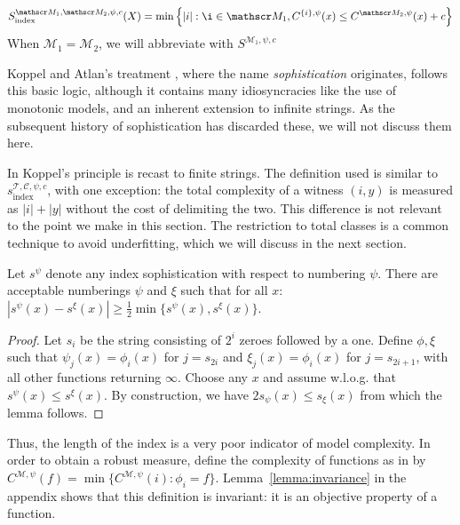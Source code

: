 \documentclass{style/llncs}
\newcommand{\M}{\mathscr M}
\newcommand{\C}{\mathscr C}
\newcommand{\T}{\mathscr T}
\newcommand{\s}{S}
\begin{document}
\begin{definition}
\[
\s_{\text{index}}^{\M_1,\M_2,\psi,c}(X) = \min\left\{ |i| : \i \in \M_1, C^{\{i\}, \psi}(x) \leq C^{\M_2, \psi}(x)+c   \right\}
\]
When $\M_1 = \M_2$, we will abbreviate with $\s^{\M_1,\psi,c}$
\end{definition}

Koppel and Atlan's treatment \cite{koppelSoph1988,koppel1991almost}, where the name \emph{sophistication} originates, follows this basic logic, although it contains many idiosyncracies like the use of monotonic models, and an inherent extension to infinite strings. As the subsequent history of sophistication has discarded these, we will not discuss them here.

In \cite{antunes2009sophistication,antunes2013sophistication} Koppel's principle is recast to finite strings. The definition used is similar to $s_\text{index}^{\T, \C,\psi,c}$, with one exception: the total complexity of a witness $(i,y)$ is measured as $|i|+|y|$ without the cost of delimiting the two. This difference is not relevant to the point we make in this section. The restriction to total classes is a common technique to avoid underfitting, which we will discuss in the next section. 

\begin{lemma}
Let $s^\psi$ denote any index sophistication with respect to numbering $\psi$.
There are acceptable numberings $\psi$ and $\xi$ such that for all $x$:\\
\-\hspace{2.8em} $|s^\psi(x) - s^\xi(x)|\geq \tfrac{1}{2}\min\{s^\psi(x),s^\xi(x)\}$.
\end{lemma}
\begin{proof}
Let $s_i$ be the string consisting of $2^{i}$ zeroes followed by a one. Define $\phi, \xi$ such that $\psi_j(x) = \phi_i(x)$ for $j = s_{2i}$ and $\xi_j(x) = \phi_i(x)$ for $j = s_{2i+1}$, with all other functions returning $\infty$. Choose any $x$ and assume w.l.o.g. that $s^\psi(x)\le s^\xi(x)$. By construction, we have $2s_\psi(x)  \leq s_\xi(x)$ from which the lemma follows.
\end{proof}
Thus, the length of the index is a very poor indicator of model complexity. In order to obtain a robust measure, define the complexity of functions as in \cite{grunwald2004shannon,vitanyi2004meaningful} by $C^{\M,\psi}(f) = \min\{C^{\M,\psi}(i):\phi_i=f\}$.
Lemma~\ref{lemma:invariance} in the appendix shows that this definition is invariant: it is an objective property of a function.
\end{document}
